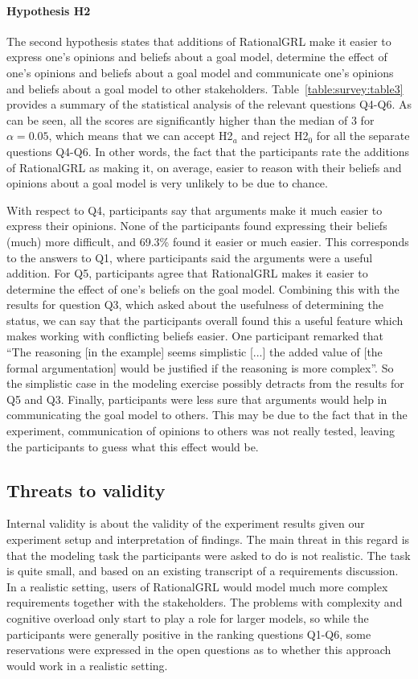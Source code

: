 \paragraph{Hypothesis H2}
The second hypothesis states that additions of RationalGRL make it easier to express one's opinions and beliefs about a goal model, determine the effect of one's opinions and beliefs about a goal model and communicate one's opinions and beliefs about a goal model to other stakeholders. Table~\ref{table:survey:table3} provides a summary of the statistical analysis of the relevant questions Q4-Q6. As can be seen, all the scores are significantly higher than the median of 3  for $\alpha = 0.05$, which means that we can accept H2$_{a}$ and reject H2$_{0}$ for all the separate questions Q4-Q6. In other words, the fact that the participants rate the additions of RationalGRL as making it, on average, easier to reason with their beliefs and opinions about a goal model is very unlikely to be due to chance. 

With respect to Q4, participants say that arguments make it much easier to express their opinions. None of the participants found expressing their beliefs (much) more difficult, and 69.3\% found it easier or much easier. This corresponds to the answers to Q1, where participants said the arguments were a useful addition. For Q5, participants agree that RationalGRL makes it easier to determine the effect of one's beliefs on the goal model. Combining this with the results for question Q3, which asked about the usefulness of determining the status, we can say that the participants overall found this a useful feature which makes working with conflicting beliefs easier. One participant remarked that ``The reasoning [in the example] seems simplistic [...] the added value of [the formal argumentation] would be justified if the reasoning is more complex''. So the simplistic case in the modeling exercise possibly detracts from the results for Q5 and Q3. Finally, participants were less sure that arguments would help in communicating the goal model to others. This may be due to the fact that in the experiment, communication of opinions to others was not really tested, leaving the participants to guess what this effect would be.  

\subsection{Threats to validity}
Internal validity is about the validity of the experiment results given our experiment setup and interpretation of findings. The main threat in this regard is that the modeling task the participants were asked to do is not realistic. The task is quite small, and based on an existing transcript of a requirements discussion. In a realistic setting, users of RationalGRL would model much more complex requirements together with the stakeholders. The problems with complexity and cognitive overload only start to play a role for larger models, so while the participants were generally positive in the ranking questions Q1-Q6, some reservations were expressed in the open questions as to whether this approach would work in a realistic setting. 

